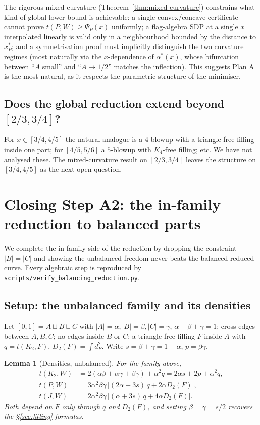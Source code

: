 \documentclass[11pt]{amsart}
\newtheorem{lemma}[theorem]{Lemma}
\theoremstyle{definition}
\newcommand{\1}{\mathbf 1}
\begin{document}
The rigorous mixed curvature (Theorem~\ref{thm:mixed-curvature}) constrains what
kind of global lower bound is achievable: a single convex/concave certificate
cannot prove $t(P,W)\ge\Psi_P(x)$ uniformly; a flag-algebra SDP at a single $x$
interpolated linearly is valid only in a neighbourhood bounded by the distance to
$x^*_P$; and a symmetrisation proof must implicitly distinguish the two curvature
regimes (most naturally via the $x$-dependence of $\alpha^*(x)$, whose
bifurcation between ``$A$ small'' and ``$A\to1/2$'' matches the inflection).  This
suggests Plan A is the most natural, as it respects the parametric structure of
the minimiser.

\subsection{Does the global reduction extend beyond $[2/3,3/4]$?}

For $x\in[3/4,4/5]$ the natural analogue is a $4$-blowup with a triangle-free
filling inside one part; for $[4/5,5/6]$ a $5$-blowup with $K_4$-free filling;
etc.  We have not analysed these.  The mixed-curvature result on $[2/3,3/4]$
leaves the structure on $[3/4,4/5]$ as the next open question.

\section{Closing Step A2: the in-family reduction to balanced parts}
\label{sec:balancing}

We complete the in-family side of the reduction by dropping the constraint
$|B|=|C|$ and showing the unbalanced freedom never beats the balanced reduced
curve.  Every algebraic step is reproduced by
\texttt{scripts/verify\_balancing\_reduction.py}.

\subsection{Setup: the unbalanced family and its densities}

Let $[0,1]=A\sqcup B\sqcup C$ with $|A|=\alpha,|B|=\beta,|C|=\gamma$,
$\alpha+\beta+\gamma=1$; cross-edges between $A,B,C$; no edges inside $B$ or $C$;
a triangle-free filling $F$ inside $A$ with $q=t(K_2,F)$, $D_2(F)=\int d_F^2$.
Write $s=\beta+\gamma=1-\alpha$, $p=\beta\gamma$.

\begin{lemma}[Densities, unbalanced]
\label{lem:densities}
For the family above,
\begin{align}
   t(K_2,W) &= 2(\alpha\beta+\alpha\gamma+\beta\gamma)+\alpha^2 q
            = 2\alpha s+2p+\alpha^2 q,\\
   t(P,W)   &= 3\alpha^2\beta\gamma\,\bigl[(2\alpha+3s)\,q+2\alpha D_2(F)\bigr],
            \label{eq:tP}\\
   t(J,W)   &= 2\alpha^2\beta\gamma\,\bigl[(\alpha+3s)\,q+4\alpha D_2(F)\bigr].
            \label{eq:tJ}
\end{align}
Both depend on $F$ only through $q$ and $D_2(F)$, and setting $\beta=\gamma=s/2$
recovers the \S\ref{sec:filling} formulas.
\end{lemma}
\end{document}
